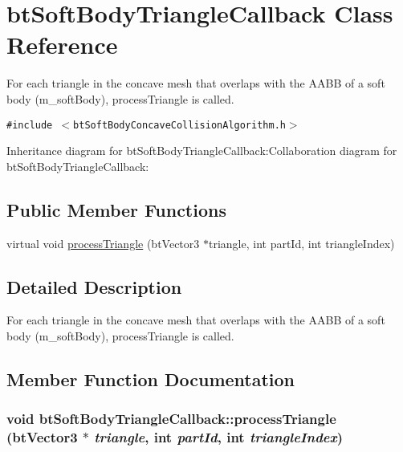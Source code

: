 \hypertarget{classbt_soft_body_triangle_callback}{
\section{btSoftBodyTriangleCallback Class Reference}
\label{classbt_soft_body_triangle_callback}
}
For each triangle in the concave mesh that overlaps with the AABB of a soft body (m\_\-softBody), processTriangle is called.  


{\tt \#include $<$btSoftBodyConcaveCollisionAlgorithm.h$>$}

Inheritance diagram for btSoftBodyTriangleCallback:Collaboration diagram for btSoftBodyTriangleCallback:\subsection*{Public Member Functions}
\begin{CompactItemize}
\item 
virtual void \hyperlink{classbt_soft_body_triangle_callback_0f8b46eba213eb55a451e182d2f6a9be}{processTriangle} (btVector3 $\ast$triangle, int partId, int triangleIndex)
\end{CompactItemize}


\subsection{Detailed Description}
For each triangle in the concave mesh that overlaps with the AABB of a soft body (m\_\-softBody), processTriangle is called. 

\subsection{Member Function Documentation}
\hypertarget{classbt_soft_body_triangle_callback_0f8b46eba213eb55a451e182d2f6a9be}{
\subsubsection[processTriangle]{\setlength{\rightskip}{0pt plus 5cm}void btSoftBodyTriangleCallback::processTriangle (btVector3 $\ast$ {\em triangle}, \/  int {\em partId}, \/  int {\em triangleIndex})}}
\label{classbt_soft_body_triangle_callback_0f8b46eba213eb55a451e182d2f6a9be}





